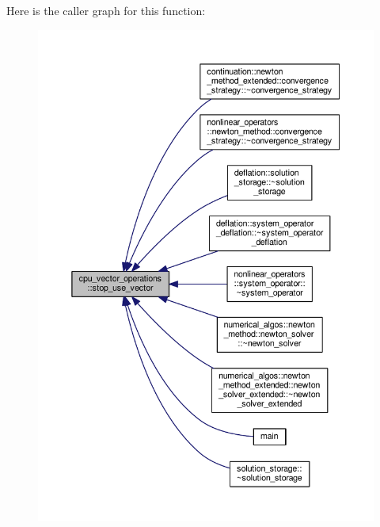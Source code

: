 Here is the caller graph for this function\-:
\nopagebreak
\begin{figure}[H]
\begin{center}
\leavevmode
\includegraphics[width=350pt]{structcpu__vector__operations_ab79fb826fdea7cc2a301e9db9bdc705e_icgraph}
\end{center}
\end{figure}




